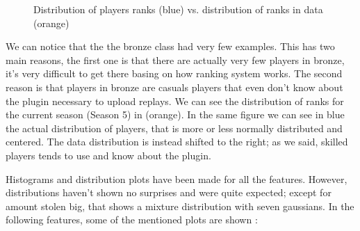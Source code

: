 \begin{figure}[H]
    \label{fig:rank_distr}
    \caption{Distribution of players ranks (blue) vs. distribution of ranks in data (orange)}
\end{figure}

We can notice that the the bronze class had very few examples. This has two main reasons, the first one is that there are actually very few players in bronze, it's very difficult to get there basing on how ranking system works. The second reason is that players in bronze are casuals players that even don't know about the plugin necessary to upload replays. We can see the distribution of ranks for the current season (Season 5) in  (orange). In the same figure we can see in blue the actual distribution of players, that is more or less normally distributed and centered. The data distribution is instead shifted to the right; as we said, skilled players tends to use and know about the plugin.

Histograms and distribution plots have been made for all the features. However, distributions haven't shown no surprises and were quite expected; except for amount stolen big, that shows a mixture distribution with seven gaussians.
In the following features, some of the mentioned plots are shown :

